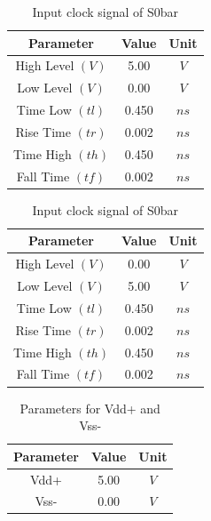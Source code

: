 \documentclass[a4paper,12pt]{article}
\begin{document}
\begin{table}[H]
		\begin{subtable}[t]{0.48\textwidth} %
			\centering
			\begin{tabular}{|c|c|c|}
				\hline
				\textbf{Parameter}          & \textbf{Value} & \textbf{Unit} \\ \hline
				High Level $(V)$            & 5.00           & $V$           \\ \hline
				Low Level $(V)$             & 0.00           & $V$           \\ \hline
				Time Low $(tl)$             & 0.450         & $ns$          \\ \hline
				Rise Time $(tr)$            & 0.002          & $ns$          \\ \hline
				Time High $(th)$            & 0.450          & $ns$          \\ \hline
				Fall Time $(tf)$            & 0.002          & $ns$          \\ \hline
			\end{tabular}
			
			\caption{Input clock signal of S0} %
		\end{subtable}
		\hfil
		\begin{subtable}[t]{0.48\textwidth} %
			\centering
			\begin{tabular}{|c|c|c|}
				\hline
				\textbf{Parameter}          & \textbf{Value} & \textbf{Unit} \\ \hline
				High Level $(V)$            & 0.00           & $V$           \\ \hline
				Low Level $(V)$             & 5.00           & $V$           \\ \hline
				Time Low $(tl)$             & 0.450          & $ns$          \\ \hline
				Rise Time $(tr)$            & 0.002          & $ns$          \\ \hline
				Time High $(th)$            & 0.450         & $ns$          \\ \hline
				Fall Time $(tf)$            & 0.002          & $ns$          \\ \hline
			\end{tabular}
			
			\caption{Input clock signal of S0bar} %
		\end{subtable}
	\end{table}
	
	\begin{table}[H]
		\centering
		\caption{Parameters for Vdd+ and Vss- }
		\begin{tabular}{|c|c|c|}
			\hline
			\textbf{Parameter} & \textbf{Value} & \textbf{Unit} \\ \hline
			Vdd+               & 5.00           & $V $            \\ \hline
			Vss-               & 0.00           & $V$             \\ \hline
		\end{tabular}
		
	\end{table}
\end{document}
